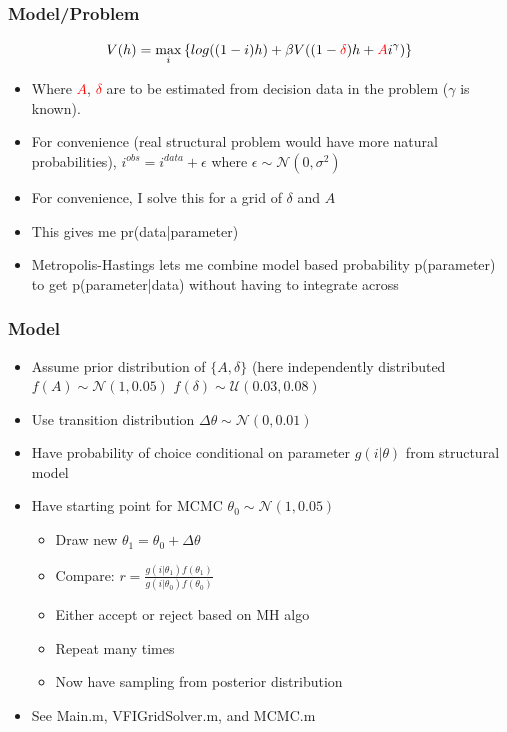 \documentclass{beamer}
\begin{document}
\begin{frame}
\frametitle[alignment=center]{Model/Problem}
$$V(h)=\underset{i}{\max}\left\{log((1-i)h)+\beta V((1-\color{red}{\delta}\color{black})h+\color{red}{A}\color{black}i^\gamma)\right\}$$
\begin{itemize}
\bigskip
\item Where \textcolor{red}{$A$}, \textcolor{red}{$\delta$} are to be estimated from decision data in the problem ($\gamma$ is known).
\bigskip
\item For convenience (real structural problem would have more natural probabilities), $i^{obs}=i^{data}+\epsilon$ where $\epsilon\sim\mathcal{N}\left(0,\sigma^2\right)$
\bigskip
\item For convenience, I solve this for a grid of $\delta$ and $A$
\bigskip
\item This gives me pr(data|parameter)
\bigskip
\item Metropolis-Hastings lets me combine model based probability p(parameter) to get p(parameter|data) without having to integrate across
\end{itemize}
\end{frame}

\begin{frame}
\frametitle[alignment=center]{Model}
\begin{itemize}
\item Assume prior distribution of $\{A,\delta\}$ (here independently distributed $f(A)\sim\mathcal{N}(1,0.05)$ $f(\delta)\sim\mathcal{U}(0.03,0.08)$
\item Use transition distribution $\Delta\theta\sim\mathcal{N}(0,0.01)$
\item Have probability of choice conditional on parameter $g(i|\theta)$  from structural model
\item Have starting point for MCMC $\theta_0\sim\mathcal{N}(1,0.05) $
\begin{itemize}
\item Draw new $\theta_1=\theta_0+\Delta\theta$
\item Compare: $r=\frac{g(i|\theta_1)f(\theta_1)}{g(i|\theta_0)f(\theta_0)}$
\item Either accept or reject based on MH algo
\item Repeat many times
\item Now have sampling from posterior distribution
\end{itemize}
\item See Main.m, VFIGridSolver.m, and MCMC.m
\end{itemize}
\end{frame}
\end{document}

